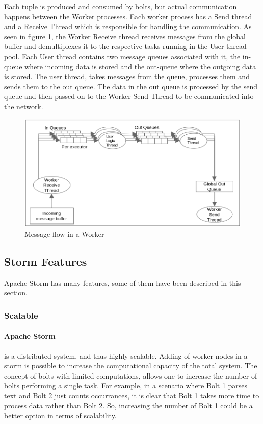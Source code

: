 \documentclass[runningheads,a4paper]{llncs}[2015/06/24]
\begin{document}
Each tuple is produced and consumed by bolts, but actual communication happens between the Worker processes. Each worker process has a Send thread and a Receive Thread which is responsible for handling the communication. As seen in figure \ref{fig:communication}, the Worker Receive thread receives messages from the global buffer and demultiplexes it to the respective tasks running in the User thread pool. Each User thread contains two message queues associated with it, the in-queue where incoming data is stored and the out-queue where the outgoing data is stored. The user thread, takes messages from the queue, processes them and sends them to the out queue. The data in the out queue is processed by the send queue and then passed on to the Worker Send Thread to be communicated into the network.

\begin{figure}
  \begin{center}
    \includegraphics[width=\textwidth]{communication.png}
    \caption{Message flow in a Worker}
    \label{fig:communication}
   \end{center}
\end{figure}

\subsection{Storm Features}
Apache Storm has many features, some of them have been described in this section.
\subsubsection{Scalable}
\paragraph{Apache Storm} is a distributed system, and thus highly scalable. Adding of worker nodes in a storm is possible to increase the computational capacity of the total system. The concept of bolts with limited computations, allows one to increase the number of bolts performing a single task. For example, in a scenario where Bolt 1 parses text and Bolt 2 just counts occurrances, it is clear that Bolt 1 takes more time to process data rather than Bolt 2. So, increasing the number of Bolt 1 could be a better option in terms of scalability.
\end{document}
